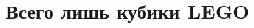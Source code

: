 \documentclass[12pt, a4paper, oneside]{article}
\theoremstyle{plain} %
\theoremstyle{definition}
\begin{document}
	
	





\section{Всего лишь кубики LEGO} 



\end{document}

